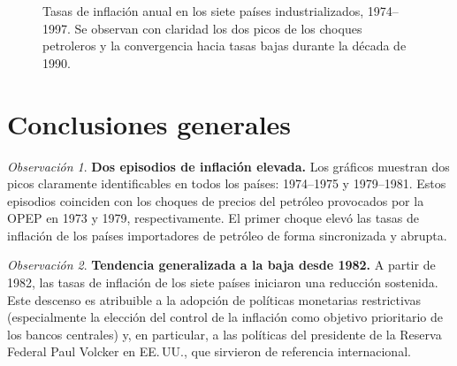 \documentclass[12pt, letterpaper]{article}
\theoremstyle{remark}
\newtheorem{obs}{Observaci\'on}
\begin{document}
\begin{figure}[htbp]
\caption{Tasas de inflaci\'on anual en los siete pa\'ises industrializados, 1974--1997.
  Se observan con claridad los dos picos de los choques petroleros y la convergencia
  hacia tasas bajas durante la d\'ecada de 1990.}
\end{figure}

\section{Conclusiones generales}

\begin{obs}
  \textbf{Dos episodios de inflaci\'on elevada.} Los gr\'aficos muestran dos
  picos claramente identificables en todos los pa\'ises: 1974--1975 y
  1979--1981. Estos episodios coinciden con los choques de precios del
  petr\'oleo provocados por la OPEP en 1973 y 1979, respectivamente.
  El primer choque elev\'o las tasas de inflaci\'on de los pa\'ises
  importadores de petr\'oleo de forma sincronizada y abrupta.
\end{obs}

\begin{obs}
  \textbf{Tendencia generalizada a la baja desde 1982.} A partir de 1982,
  las tasas de inflaci\'on de los siete pa\'ises iniciaron una reducci\'on
  sostenida. Este descenso es atribuible a la adopci\'on de pol\'iticas
  monetarias restrictivas (especialmente la elecci\'on del control de la
  inflaci\'on como objetivo prioritario de los bancos centrales) y, en
  particular, a las pol\'iticas del presidente de la Reserva Federal Paul
  Volcker en EE.\,UU., que sirvieron de referencia internacional.
\end{obs}
\end{document}

